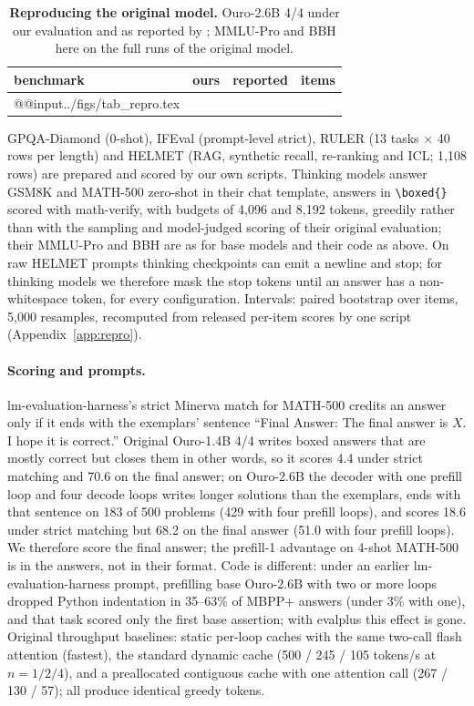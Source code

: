 \documentclass[11pt]{article}
\begin{document}
\begin{table}[h]
\centering\small
\begin{tabular}{@{}lrrr@{}}
\toprule
benchmark & ours & reported & items \\
\midrule
\csname @@input\endcsname ../figs/tab_repro.tex
\bottomrule
\end{tabular}
\caption{\textbf{Reproducing the original model.} Ouro-2.6B 4/4 under our evaluation and as reported by
\citet[Table~8]{ouro}; MMLU-Pro and BBH here on the full runs of the original model.}
\label{tab:repro}
\end{table} GPQA-Diamond (0-shot), IFEval (prompt-level strict), RULER (13 tasks $\times$ 40 rows per length)
and HELMET (RAG, synthetic recall, re-ranking and ICL; 1,108 rows) are prepared and scored by our own scripts. Thinking
models answer GSM8K and MATH-500 zero-shot in their chat template, answers in \verb|\boxed{}| scored with math-verify,
with budgets of 4,096 and 8,192 tokens, greedily rather than with the sampling and model-judged scoring of their original
evaluation; their MMLU-Pro and BBH are as for base models and their code as above. On raw HELMET prompts thinking checkpoints
can emit a newline and stop; for thinking models we therefore mask the stop tokens until an answer has a non-whitespace
token, for every configuration. Intervals: paired bootstrap over items, 5,000 resamples, recomputed from released
per-item scores by one script (Appendix~\ref{app:repro}).

\paragraph{Scoring and prompts.} lm-evaluation-harness's strict Minerva match for MATH-500 credits an answer only if it
ends with the exemplars' sentence ``Final Answer: The final answer is $X$. I hope it is correct.'' Original Ouro-1.4B 4/4
writes boxed answers that are mostly correct but closes them in other words, so it scores 4.4 under strict matching and
70.6 on the final answer; on Ouro-2.6B the decoder with one prefill loop and four decode loops writes longer solutions
than the exemplars, ends with that sentence on 183 of 500 problems (429 with four prefill loops), and scores 18.6 under
strict matching but 68.2 on the final answer (51.0 with four prefill loops). We therefore score the final answer; the
prefill-1 advantage on 4-shot MATH-500 is in the answers, not in their format. Code is different: under an earlier
lm-evaluation-harness prompt, prefilling base Ouro-2.6B with two or more loops dropped Python indentation in 35--63\% of
MBPP+ answers (under 3\% with one), and that task scored only the first base assertion; with evalplus this effect is gone. Original throughput baselines: static per-loop caches with the same two-call flash
attention (fastest), the standard dynamic cache (500 / 245 / 105 tokens/s at $n=1/2/4$), and a preallocated contiguous
cache with one attention call (267 / 130 / 57); all produce identical greedy tokens.
\end{document}
